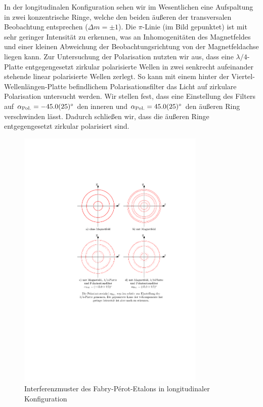 \documentclass[11pt, a4paper]{article}
\begin{document}
In der longitudinalen Konfiguration sehen wir im Wesentlichen eine Aufspaltung in zwei konzentrische Ringe, welche den beiden äußeren der transversalen Beobachtung entsprechen ($\Delta m = \pm 1$).
Die $\pi$-Linie (im Bild gepunktet) ist mit sehr geringer Intensität zu erkennen, was an Inhomogenitäten des Magnetfeldes und einer kleinen Abweichung der Beobachtungsrichtung von der Magnetfeldachse liegen kann.
Zur Untersuchung der Polarisation nutzten wir aus, dass eine $\lambda/4$-Platte entgegengesetzt zirkular polarisierte Wellen in zwei senkrecht aufeinander stehende linear polarisierte Wellen zerlegt.
So kann mit einem hinter der Viertel-Wellenlängen-Platte befindlichem Polarisationsfilter das Licht auf zirkulare Polarisation untersucht werden.
Wir stellen fest, dass eine Einstellung des Filters auf $\alpha_\mathrm{Pol.} = \SI{-45 +- 2,5}{\degree}$ den inneren und $\alpha_\mathrm{Pol.} = \SI{+45 +- 2,5}{\degree}$ den äußeren Ring verschwinden lässt.
Dadurch schließen wir, dass die äußeren Ringe entgegengesetzt zirkular polarisiert sind.
\begin{figure}[h]
	\centering
	\includegraphics[width=0.8\textwidth]{./figures/zeeman_longitudinal.pdf}
	\caption{Interferenzmuster des Fabry-Pérot-Etalons in longitudinaler Konfiguration}
	\label{fig:zeeman_longitudinal}
\end{figure}
\end{document}
